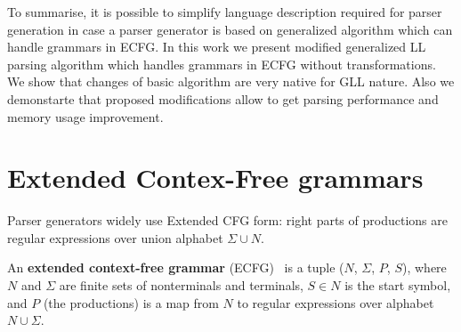 \documentclass[runningheads,a4paper]{llncs}
\begin{document}
To summarise, it is possible to simplify language description required for parser generation in case a parser generator is based on generalized algorithm which can handle grammars in ECFG.
In this work we present modified generalized LL parsing algorithm which handles grammars in ECFG without transformations.
We show that changes of basic algorithm are very native for GLL nature. 
Also we demonstarte that proposed modifications allow to get parsing performance and memory usage improvement.





\section{Extended Contex-Free grammars}%



Parser generators widely use Extended CFG form: right parts of productions are regular 
expressions over union alphabet $\Sigma \cup N$. 
\begin{mydef}
An \textbf{extended context-free grammar} (ECFG)~\cite{ECFG} is a tuple ($N$, $\Sigma$, $P$, $S$), where $N$
and $\Sigma$ are finite sets of nonterminals and terminals, $ S\in N$ is the start symbol,
and $P$ (the productions) is a map from $N$ to regular expressions over alphabet $N \cup \Sigma$.
\end{mydef}
\end{document}
